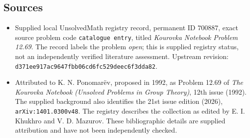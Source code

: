 \documentclass[11pt]{article}
\begin{document}
\subsection{Sources}
\begin{itemize}
\item Supplied local UnsolvedMath registry record, permanent ID \(700887\), exact source problem code \texttt{catalogue entry}, titled \emph{Kourovka Notebook Problem 12.69}. The record labels the problem \emph{open}; this is supplied registry status, not an independently verified literature assessment. Upstream revision: \texttt{d371ee917ac9647fbb06cd6fc529deec6f3dda82}.
\item Attributed to K. N. Ponomar\"ev, proposed in 1992, as Problem 12.69 of \emph{The Kourovka Notebook (Unsolved Problems in Group Theory)}, 12th issue (1992). The supplied background also identifies the 21st issue edition (2026), \texttt{arXiv:1401.0300v48}. The registry describes the collection as edited by E. I. Khukhro and V. D. Mazurov. These bibliographic details are supplied attribution and have not been independently checked.
\end{itemize}
\end{document}
